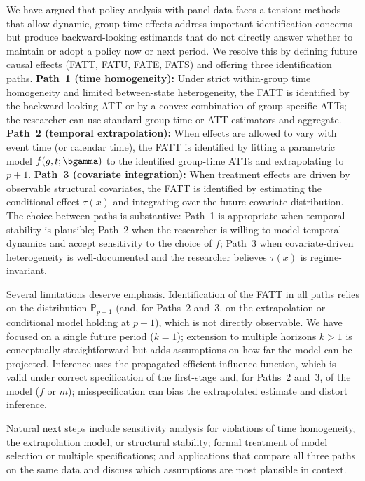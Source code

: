 \documentclass{article}
\renewcommand{\P}{\mathbb{P}}
\begin{document}
We have argued that policy analysis with panel data faces a tension: methods that allow dynamic, group-time effects address important identification concerns but produce backward-looking estimands that do not directly answer whether to maintain or adopt a policy now or next period. We resolve this by defining future causal effects (FATT, FATU, FATE, FATS) and offering three identification paths. \textbf{Path~1 (time homogeneity):} Under strict within-group time homogeneity and limited between-state heterogeneity, the FATT is identified by the backward-looking ATT or by a convex combination of group-specific ATTs; the researcher can use standard group-time or ATT estimators and aggregate. \textbf{Path~2 (temporal extrapolation):} When effects are allowed to vary with event time (or calendar time), the FATT is identified by fitting a parametric model $f(g,t;\bgamma)$ to the identified group-time ATTs and extrapolating to $p+1$. \textbf{Path~3 (covariate integration):} When treatment effects are driven by observable structural covariates, the FATT is identified by estimating the conditional effect $\tau(x)$ and integrating over the future covariate distribution. The choice between paths is substantive: Path~1 is appropriate when temporal stability is plausible; Path~2 when the researcher is willing to model temporal dynamics and accept sensitivity to the choice of $f$; Path~3 when covariate-driven heterogeneity is well-documented and the researcher believes $\tau(x)$ is regime-invariant.

Several limitations deserve emphasis. Identification of the FATT in all paths relies on the distribution $\P_{p+1}$ (and, for Paths~2 and~3, on the extrapolation or conditional model holding at $p+1$), which is not directly observable. We have focused on a single future period ($k=1$); extension to multiple horizons $k>1$ is conceptually straightforward but adds assumptions on how far the model can be projected. Inference uses the propagated efficient influence function, which is valid under correct specification of the first-stage and, for Paths~2 and~3, of the model ($f$ or $m$); misspecification can bias the extrapolated estimate and distort inference.

Natural next steps include sensitivity analysis for violations of time homogeneity, the extrapolation model, or structural stability; formal treatment of model selection or multiple specifications; and applications that compare all three paths on the same data and discuss which assumptions are most plausible in context.
\end{document}
